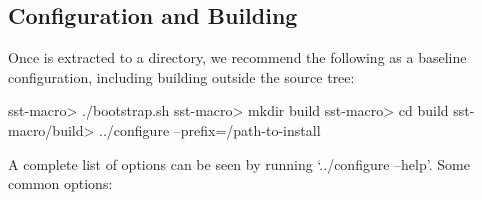 \subsection{Configuration and Building}
\label{subsec:build:configure}

Once \sstmacro is extracted to a directory, we recommend the following as a baseline configuration, including building outside the source tree:

\begin{ShellCmd}
sst-macro> ./bootstrap.sh
sst-macro> mkdir build
sst-macro> cd build
sst-macro/build> ../configure --prefix=/path-to-install 
\end{ShellCmd}


A complete list of options can be seen by running `../configure --help'.   Some common options:

